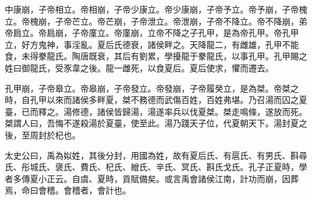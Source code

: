 中康崩，子帝相立。帝相崩，子帝少康立。帝少康崩，子帝予立。帝予崩，子帝槐立。帝槐崩，子帝芒立。帝芒崩，子帝泄立。帝泄崩，子帝不降立。帝不降崩，弟帝扃立。帝扃崩，子帝廑立。帝廑崩，立帝不降之子孔甲，是為帝孔甲。帝孔甲立，好方鬼神，事淫亂。夏后氏德衰，諸侯畔之。天降龍二，有雌雄，孔甲不能食，未得豢龍氏。陶唐既衰，其后有劉累，學擾龍于豢龍氏，以事孔甲。孔甲賜之姓曰御龍氏，受豕韋之後。龍一雌死，以食夏后。夏后使求，懼而遷去。

孔甲崩，子帝皋立。帝皋崩，子帝發立。帝發崩，子帝履癸立，是為桀。帝桀之時，自孔甲以來而諸侯多畔夏，桀不務德而武傷百姓，百姓弗堪。乃召湯而囚之夏臺，已而釋之。湯修德，諸侯皆歸湯，湯遂率兵以伐夏桀。桀走鳴條，遂放而死。桀謂人曰，吾悔不遂殺湯於夏臺，使至此。湯乃踐天子位，代夏朝天下。湯封夏之後，至周封於杞也。

太史公曰，禹為姒姓，其後分封，用國為姓，故有夏后氏、有扈氏、有男氏、斟尋氏、彤城氏、褒氏、費氏、杞氏、繒氏、辛氏、冥氏、斟氏戈氏。孔子正夏時，學者多傳夏小正云。自虞、夏時，貢賦備矣。或言禹會諸侯江南，計功而崩，因葬焉，命曰會稽。會稽者，會計也。